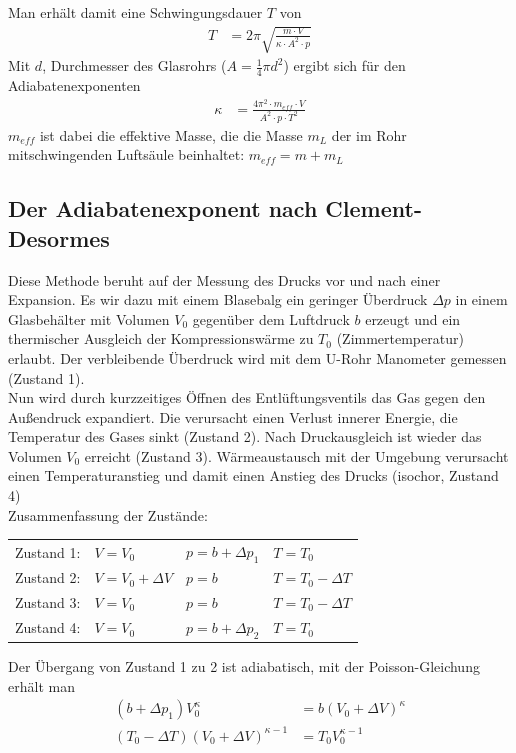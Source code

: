 \documentclass[12pt, a4paper, twoside]{scrartcl}
\begin{document}
Man erhält damit eine Schwingungsdauer $T$ von
\begin{align*}
T &= 2\pi \sqrt{\frac{m\cdot V}{\kappa \cdot A^2 \cdot p}}
\end{align*}
Mit $d$, Durchmesser des Glasrohrs ($A = \frac{1}{4} \pi d^2$) ergibt sich für den Adiabatenexponenten
\begin{align*}
\kappa &= \frac{4 \pi^2 \cdot m_{eff} \cdot V}{A^2 \cdot p \cdot T^2}
\end{align*}
$m_{eff}$ ist dabei die effektive Masse, die die Masse $m_L$ der im Rohr mitschwingenden Luftsäule beinhaltet: $m_{eff} = m + m_L$

\subsection{Der Adiabatenexponent nach Clement-Desormes}
Diese Methode beruht auf der Messung des Drucks vor und nach einer Expansion. Es wir dazu mit einem Blasebalg ein geringer Überdruck $\Delta p$ in einem Glasbehälter mit Volumen $V_0$  gegenüber dem Luftdruck $b$ erzeugt und ein thermischer Ausgleich der Kompressionswärme zu $T_0$ (Zimmertemperatur) erlaubt. Der verbleibende Überdruck wird mit dem U-Rohr Manometer gemessen (Zustand 1). \\
Nun wird durch kurzzeitiges Öffnen des Entlüftungsventils das Gas gegen den Außendruck expandiert. Die verursacht einen Verlust innerer Energie, die Temperatur des Gases sinkt (Zustand 2). Nach Druckausgleich ist wieder das Volumen $V_0$ erreicht (Zustand 3). Wärmeaustausch mit der Umgebung verursacht einen Temperaturanstieg und damit einen Anstieg des Drucks (isochor, Zustand 4) \\
Zusammenfassung der Zustände:
\begin{table}
\begin{tabular}{llll}
Zustand 1: & $V=V_0$ & $p=b+\Delta p_1$ & $T=T_0$ \\
Zustand 2: & $V=V_0+\Delta V$ & $p=b$ & $T=T_0-\Delta T$ \\
Zustand 3: & $V=V_0$ & $p=b$ & $T=T_0-\Delta T$ \\
Zustand 4: & $V=V_0$ & $p=b+\Delta p_2$ & $T=T_0$ \\
\end{tabular}
\end{table}
Der Übergang von Zustand 1 zu 2 ist adiabatisch, mit der Poisson-Gleichung erhält man
\begin{align}
\label{eq:6}
\left(b + \Delta p_1\right)V_0^{\kappa} &= b\left(V_0 + \Delta V\right)^{\kappa} \\
\label{eq:7}
\left(T_0 - \Delta T\right)\left(V_0 + \Delta V\right)^{\kappa -1} &= T_0 V_0^{\kappa -1}
\end{align}
\end{document}
